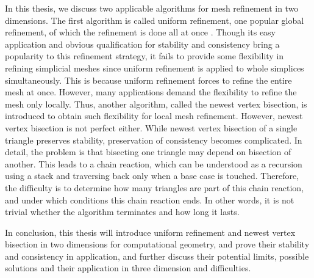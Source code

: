In this thesis, we discuss two applicable algorithms for mesh refinement in two dimensions. The first algorithm is called uniform refinement, one popular global refinement, of which the refinement is done all at once \cite{bank1983some,Bey1995,bey2000simplicial}. Though its easy application and obvious qualification for stability and consistency bring a popularity to this refinement strategy, it fails to provide some flexibility in refining simplicial meshes since uniform refinement is applied to whole simplices simultaneously. This is because uniform refinement forces to refine the entire mesh at once. However, many applications demand the flexibility to refine the mesh only locally. Thus, another algorithm, called the newest vertex bisection, is introduced to obtain such flexibility for local mesh refinement. However, newest vertex bisection is not perfect either. While newest vertex bisection of a single triangle preserves stability, preservation of consistency becomes complicated. In detail, the problem is that bisecting one triangle may depend on bisection of another. This leads to a chain reaction, which can be understood as a recursion using a stack and traversing back only when a base case is touched. Therefore, the difficulty is to determine how many triangles are part of this chain reaction, and under which conditions this chain reaction ends. In other words, it is not trivial whether the algorithm terminates and how long it lasts. 

In conclusion, this thesis will introduce uniform refinement and newest vertex bisection in two dimensions for computational geometry, and prove their stability and consistency in application, and further discuss their potential limits, possible solutions and their application in three dimension and difficulties.

